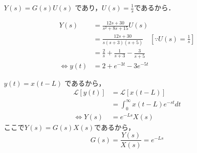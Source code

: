 \documentclass[a4paper,12pt]{article}
\begin{document}
\begin{tcolorbox}[title={[27] 伝達関数が
    \[G(s)=\frac{12s+30}{s^2+8s+15}\]
    \qquad であるときのステップ応答を求めよ． }]

    \qquad \(Y(s) =G(s)U(s)\) であり，\(U(s)=\frac{1}{s}\)であるから． 

    \begin{align*}
        Y(s)
        &= \frac{12s+30}{s^2+8s+15}U(s) \\
        &= \frac{12s+30}{s(s+3)(s+5)} \quad [\because U(s)=\frac{1}{s}]\\
        &= \frac{2}{s} + \frac{1}{s+3} - \frac{3}{s+5}\\
        \Leftrightarrow y(t) &=2 + e^{-3t} - 3e^{-5t}
    \end{align*}

\end{tcolorbox}
\begin{tcolorbox}[title={[28] \(x(t)[m^3/s]\)は，操作バルブ直後の流量を表し，
    長い配管を通って\\
    \qquad \(L[s]\)後に給水場所に到達したとする．\\
    \qquad このとき，\(x(t)\)から給水量\(y(t)\)までの伝達関数を求めよ．}]
    \quad \(y(t)=x(t-L)\) であるから，
    \begin{align*}
    \mathcal{L} \left[ y(t) \right] 
    &= \mathcal{L} \left[ x(t-L) \right] \\
    &= \int_{0}^{\infty} x(t-L)e^{-st}dt \\
    \Leftrightarrow Y(s) &= e^{-Ls}X(s)
    \end{align*}
    \quad ここで\(Y(s)=G(s)X(s)\)であるから，
    \[
    G(s) = \frac{Y(s)}{X(s)} = e^{-Ls}
    \]
\end{tcolorbox}
\newpage
\end{document}
